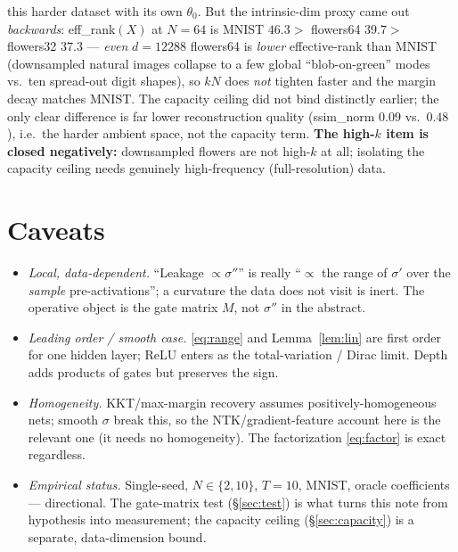 \documentclass[11pt]{article}
\begin{document}
\begin{itemize}
  this harder dataset with its own $\theta_0$. But the intrinsic-dim proxy came out \emph{backwards}:
  eff\_rank$(X)$ at $N{=}64$ is MNIST $\mathbf{46.3} > $ flowers64 $\mathbf{39.7} > $ flowers32 $37.3$
  --- \emph{even} $d{=}12288$ flowers64 is \emph{lower} effective-rank than MNIST (downsampled natural
  images collapse to a few global ``blob-on-green'' modes vs.\ ten spread-out digit shapes), so $kN$
  does \emph{not} tighten faster and the margin decay matches MNIST. The capacity ceiling did not bind
  distinctly earlier; the only clear difference is far lower reconstruction quality (ssim\_norm $0.09$
  vs.\ $0.48$), i.e.\ the harder ambient space, not the capacity term. \textbf{The high-$k$ item is
  closed negatively:} downsampled flowers are not high-$k$ at all; isolating the capacity ceiling needs
  genuinely high-frequency (full-resolution) data.
\end{itemize}

\section{Caveats}
\begin{itemize}
  \item \emph{Local, data-dependent.} ``Leakage $\propto\sigma''$'' is really ``$\propto$ the range of
  $\sigma'$ over the \emph{sample} pre-activations''; a curvature the data does not visit is inert. The
  operative object is the gate matrix $M$, not $\sigma''$ in the abstract.
  \item \emph{Leading order / smooth case.} \eqref{eq:range} and Lemma~\ref{lem:lin} are first order for
  one hidden layer; ReLU enters as the total-variation / Dirac limit. Depth adds products of gates but
  preserves the sign.
  \item \emph{Homogeneity.} KKT/max-margin recovery assumes positively-homogeneous nets; smooth $\sigma$
  break this, so the NTK/gradient-feature account here is the relevant one (it needs no homogeneity). The
  factorization \eqref{eq:factor} is exact regardless.
  \item \emph{Empirical status.} Single-seed, $N\in\{2,10\}$, $T=10$, MNIST, oracle coefficients ---
  directional. The gate-matrix test (\S\ref{sec:test}) is what turns this note from hypothesis into
  measurement; the capacity ceiling (\S\ref{sec:capacity}) is a separate, data-dimension bound.
\end{itemize}
\end{document}
